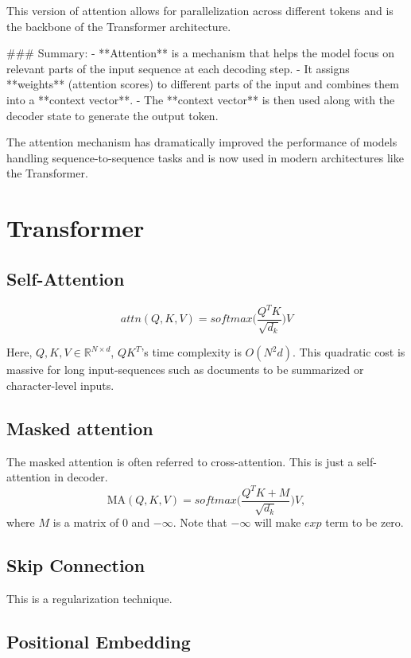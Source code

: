 This version of attention allows for parallelization across different tokens and is the backbone of the Transformer architecture.

### Summary:
- **Attention** is a mechanism that helps the model focus on relevant parts of the input sequence at each decoding step.
- It assigns **weights** (attention scores) to different parts of the input and combines them into a **context vector**.
- The **context vector** is then used along with the decoder state to generate the output token.

The attention mechanism has dramatically improved the performance of models handling sequence-to-sequence tasks and is now used in modern architectures like the Transformer.




\section{Transformer}
\label{sec:nlp_transformer}


\subsection{Self-Attention}
$$attn(Q,K,V) = softmax\bigg(\frac{Q^TK}{\sqrt{d_k}}\bigg)V$$

Here, $Q, K, V\in \mathbb{R}^{N\times d}$, $QK^T$'s time complexity is $O(N^2d)$. This quadratic cost is massive for long input-sequences such as documents to be summarized or character-level inputs.


\subsection{Masked attention}
The masked attention is often referred to cross-attention. This is just a self-attention in decoder.
$$\textrm{MA}(Q,K,V) = softmax\bigg(\frac{Q^TK+M}{\sqrt{d_k}}\bigg)V,$$
where $M$ is a matrix of 0 and $-\infty$. Note that $-\infty$ will make $exp$ term to be zero.

\subsection{Skip Connection}
This is a regularization technique.

\subsection{Positional Embedding}

